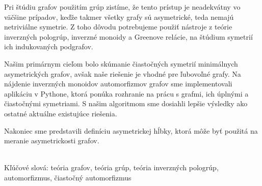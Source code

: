 \documentclass[12pt, a4paper, oneside]{book}
\numberwithin{definition}{chapter}
\numberwithin{theorem}{chapter}
\begin{document}
Pri štúdiu grafov použitím grúp zistíme, že tento prístup je neadekvátny vo väčšine prípadov, keďže takmer všetky grafy sú asymetrické, teda nemajú netriviálne symetrie. Z toho dôvodu potrebujeme použiť nástroje z teórie inverzných pologrúp, inverzné monoidy a Greenove relácie, na štúdium symetrií ich indukovaných podgrafov.

Našim primárnym cieľom bolo skúmanie čiastočných symetrií minimálnych asymetrických grafov, avšak naše riešenie je vhodné pre ľubovoľné grafy. Na nájdenie inverzných monoidov automorfizmov grafov sme implementovali aplikáciu v Pythone, ktorá ponúka rozhranie na prácu s grafmi, ich úplnými a čiastočnými symetriami. S našim algoritmom sme dosiahli lepšie výsledky ako ostatné aktuálne existujúce riešenia.

Nakoniec sme predstavili definíciu asymetrickej hĺbky, ktorá môže byť použitá na meranie asymetrickosti grafov.

~\\
Kľúčové slová: teória grafov, teória grúp, teória inverzných pologrúp, automorfizmus, čiastočný automorfizmus

\tableofcontents

\listoffigures
\listoftables

\mainmatter







\backmatter

\nocite{*}




\end{document}
